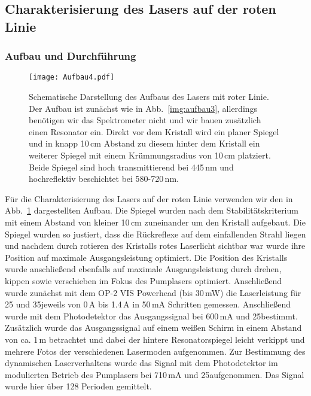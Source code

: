\subsection{Charakterisierung des Lasers auf der roten Linie}

\subsubsection{Aufbau und Durchführung}

\begin{figure}[H]
\begin{center}
  \texttt{[image: Aufbau4.pdf]}
  \caption{Schematische Darstellung des Aufbaus des Lasers mit roter Linie.
  Der Aufbau ist zunächst wie in Abb.~\ref{img:aufbau3},
  allerdings benötigen wir das Spektrometer nicht und wir bauen zusätzlich einen Resonator ein.
   Direkt vor dem Kristall wird ein planer Spiegel und in knapp 10\,cm Abstand
   zu diesem hinter dem Kristall ein weiterer Spiegel mit einem Krümmungsradius von 10\,cm platziert.
   Beide Spiegel sind hoch transmittierend bei 445\,nm und hochreflektiv beschichtet bei 580-720\,nm.}
  \label{img:aufbau4}
\end{center}
\end{figure}

Für die Charakterisierung des Lasers auf der roten Linie verwenden wir den in
Abb.~\ref{img:aufbau4} dargestellten Aufbau. Die Spiegel wurden nach dem Stabilitätskriterium mit
einem Abstand von kleiner 10\,cm zuneinander um den Kristall aufgebaut. Die Spiegel wurden so
justiert, dass die Rückreflexe auf dem einfallenden Strahl liegen und nachdem durch rotieren des
Kristalls rotes Laserlicht sichtbar war wurde ihre Position auf maximale Ausgangsleistung
optimiert. Die Position des Kristalls wurde anschließend ebenfalls auf maximale Ausgangsleistung
durch drehen, kippen sowie verschieben im Fokus des Pumplasers optimiert.
Anschließend wurde zunächst mit dem OP-2 VIS Powerhead (bis 30\,mW) die Laserleistung für 25\grad
und 35\grad jeweils von 0\,A bis 1.4\,A in 50\,mA Schritten gemessen.
Anschließend wurde mit dem Photodetektor das Ausgangssignal bei 600\,mA und 25\grad bestimmt.
Zusätzlich wurde das Ausgangssignal auf einem weißen Schirm in einem Abstand von ca. 1\,m
betrachtet und dabei der hintere Resonatorspiegel leicht verkippt und mehrere Fotos der
verschiedenen Lasermoden aufgenommen.
Zur Bestimmung des dynamischen Laserverhaltens wurde das Signal mit dem Photodetektor im
modulierten Betrieb des Pumplasers bei 710\,mA und 25\grad aufgenommen. Das Signal wurde hier über
128 Perioden gemittelt.




